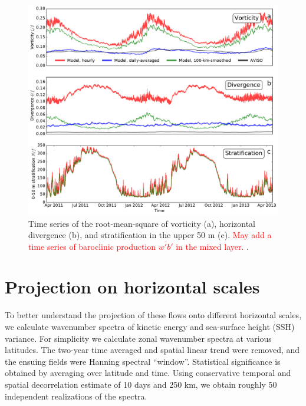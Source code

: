 \documentclass[grl]{agutex2015}
\begin{document}
\begin{article}
 \begin{figure}[ht]
   \begin{center}
     \includegraphics[width=.9\textwidth]{figs/fig2.pdf}
  \caption{Time series of the root-mean-square of vorticity (a),
  horizontal divergence (b), and stratification in the upper 50 m (c).
  \textcolor{red}{May add a time series of baroclinic production $\overline{w'b'}$ in
  the mixed layer. }.}
  \label{fig2}
  \end{center}
\end{figure}

\section{Projection on horizontal scales}

To better understand the projection of these flows onto different horizontal
scales, we calculate wavenumber spectra of kinetic energy and sea-surface height
(SSH) variance. For simplicity we calculate zonal wavenumber spectra at various
latitudes. The two-year time averaged and spatial linear trend were
removed, and the ensuing fields were Hanning spectral ``window''. Statistical significance
is obtained by averaging over latitude and time. Using conservative temporal and
spatial decorrelation estimate of 10 days and 250 km, we obtain roughly 50
independent realizations of the spectra.


\end{article}
\end{document}
